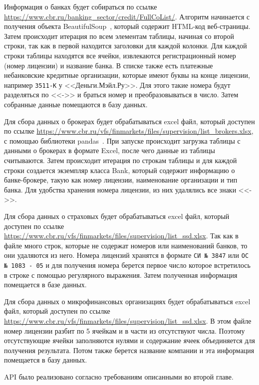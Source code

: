 \documentclass[PI, VKR]{HSEUniversity}
\begin{document}
Информация о банках будет собираться по ссылке \url{https://www.cbr.ru/banking\_sector/credit/FullCoList/}. Алгоритм начинается с получения объекта BeautifulSoup~\autocite{richardsonleonard_beautiful_2007}, который содержит HTML-код веб-страницы. Затем происходит итерация по всем элементам таблицы, начиная со второй строки, так как в первой находится заголовки для каждой колонки. Для каждой строки таблицы находятся все ячейки, извлекаются регистрационный номер (номер лицензии) и название банка. В списке также есть платежные небанковские кредитные организации, которые имеют буквы на конце лицензии, например \texttt{3511-К} у {}<<Деньги.Мэйл.Ру>>{}. Для этого такие номера будут разделяться по {}<<->>{} и браться номер и преобразовываться в число. Затем собранные данные помещаются в базу данных.

Для сбора данных о брокерах будет обрабатываться excel файл, который доступен по ссылке \url{https://www.cbr.ru/vfs/finmarkets/files/supervision/list\_brokers.xlsx}, с помощью библиотеки pandas~\autocite{team_pandasdev_2023}. При запуске происходит загрузка таблицы с данными о брокерах в формате Excel, после чего данные из таблицы считываются. Затем происходит итерация по строкам таблицы и для каждой строки создается экземпляр класса Bank, который содержит информацию о банке-брокере, такую как номер лицензии, наименование организации и тип банка. Для удобства хранения номера лицензии, из них удалялись все знаки {}<<->>{}.

Для сбора данных о страховых будет обрабатываться excel файл, который доступен по ссылке \url{https://www.cbr.ru/vfs/finmarkets/files/supervision/list\_ssd.xlsx}. Так как в файле много строк, которые не содержат номеров или наименований банков, то они удаляются из него. Номера лицензий хранятся в формате \texttt{СИ № 3847} или \texttt{ОС № 1083 - 05} и для получения номера берется первое число которое встретилось в строке с помощью регулярного выражения. Затем полученная информация помещается в базе данных.

Для сбора данных о микрофинансовых организациях будет обрабатываться excel файл, который доступен по ссылке \url{https://www.cbr.ru/vfs/finmarkets/files/supervision/list\_ssd.xlsx}. В этом файле номер лицензии разбит по 5 ячейкам и в части из отсутствуют числа. Поэтому отсутствующие ячейки заполняются нулями и содержание ячеек объединяется для получения результата. Потом также берется название компании и эта информация помещается в базу данных.

API было реализовано согласно требованиям описанными во второй главе.
\end{document}
